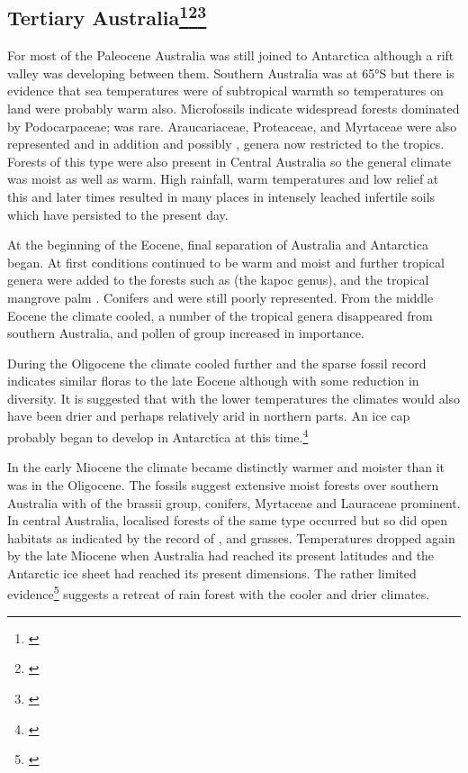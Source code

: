 \subsection[Tertiary Australia]{Tertiary Australia\footnote{\cite{kemp1978tertiary}}\footnote{\cite{martin1981tertiary}}\footnote{\cite{smith1982history}}}

For most of the Paleocene Australia was still joined to Antarctica although a rift valley was developing between them.
Southern Australia was at 65°S but there is evidence that sea temperatures were of subtropical warmth so temperatures on land were probably warm also.
Microfossils indicate widespread forests dominated by Podocarpaceae;  was rare.
Araucariaceae, Proteaceae, and Myrtaceae were also represented and in addition  and possibly , genera now restricted to the tropics.
Forests of this type were also present in Central Australia so the general climate was moist as well as warm.
High rainfall, warm temperatures and low relief at this and later times resulted in many places in intensely leached infertile soils which have persisted to the present day.

At the beginning of the Eocene, final separation of Australia and Antarctica began.
At first conditions continued to be warm and moist and further tropical genera were added to the forests such as  (the kapoc genus), and the tropical mangrove palm .
Conifers and  were still poorly represented.
From the middle Eocene the climate cooled, a number of the tropical genera disappeared from southern Australia, and pollen of  group increased in importance.

During the Oligocene the climate cooled further and the sparse fossil record indicates similar floras to the late Eocene although with some reduction in diversity.
It is suggested that with the lower temperatures the climates would also have been drier and perhaps relatively arid in northern parts.
An ice cap probably began to develop in Antarctica at this time.\footnote{\cite{kemp1978tertiary}}

In the early Miocene the climate became distinctly warmer and moister than it was in the Oligocene.
The fossils suggest extensive moist forests over southern Australia with  of the brassii group, conifers, Myrtaceae and Lauraceae prominent.
In central Australia, localised forests of the same type occurred but so did open habitats as indicated by the record of ,  and grasses.
Temperatures dropped again by the late Miocene when Australia had reached its present latitudes and the Antarctic ice sheet had reached its present dimensions.
The rather limited evidence\footnote{\cite{kemp1978tertiary}} suggests a retreat of rain forest with the cooler and drier climates.

